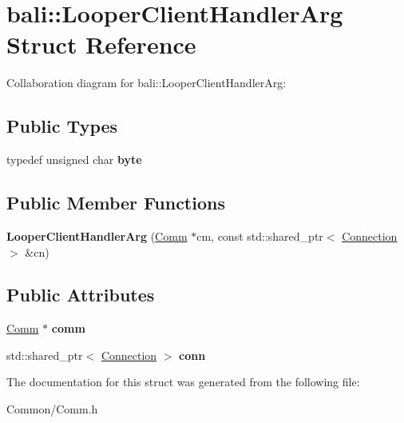 \hypertarget{structbali_1_1_looper_client_handler_arg}{\section{bali\-:\-:Looper\-Client\-Handler\-Arg Struct Reference}
\label{structbali_1_1_looper_client_handler_arg}
}


Collaboration diagram for bali\-:\-:Looper\-Client\-Handler\-Arg\-:
\subsection*{Public Types}
\begin{DoxyCompactItemize}
\item 
\hypertarget{structbali_1_1_looper_client_handler_arg_a3ec0be0e4bea06383efff5879e4fd998}{typedef unsigned char {\bfseries byte}}\label{structbali_1_1_looper_client_handler_arg_a3ec0be0e4bea06383efff5879e4fd998}

\end{DoxyCompactItemize}
\subsection*{Public Member Functions}
\begin{DoxyCompactItemize}
\item 
\hypertarget{structbali_1_1_looper_client_handler_arg_a9e585262741ec95a05a6e8f754fa53b6}{{\bfseries Looper\-Client\-Handler\-Arg} (\hyperlink{classbali_1_1_comm}{Comm} $\ast$cm, const std\-::shared\-\_\-ptr$<$ \hyperlink{classbali_1_1_connection}{Connection} $>$ \&cn)}\label{structbali_1_1_looper_client_handler_arg_a9e585262741ec95a05a6e8f754fa53b6}

\end{DoxyCompactItemize}
\subsection*{Public Attributes}
\begin{DoxyCompactItemize}
\item 
\hypertarget{structbali_1_1_looper_client_handler_arg_ace1493b261890cc1c90a41e67e12539a}{\hyperlink{classbali_1_1_comm}{Comm} $\ast$ {\bfseries comm}}\label{structbali_1_1_looper_client_handler_arg_ace1493b261890cc1c90a41e67e12539a}

\item 
\hypertarget{structbali_1_1_looper_client_handler_arg_ab3d6eeb973714e1b18c3e16b4fc2be03}{std\-::shared\-\_\-ptr$<$ \hyperlink{classbali_1_1_connection}{Connection} $>$ {\bfseries conn}}\label{structbali_1_1_looper_client_handler_arg_ab3d6eeb973714e1b18c3e16b4fc2be03}

\end{DoxyCompactItemize}


The documentation for this struct was generated from the following file\-:\begin{DoxyCompactItemize}
\item 
Common/Comm.\-h\end{DoxyCompactItemize}
